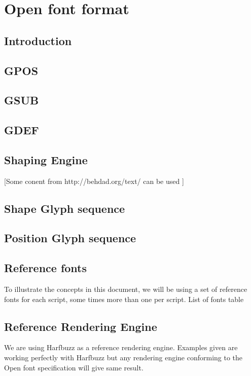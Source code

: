 \chapter{Open font format}

\section{Introduction}

\section{GPOS}

\section{GSUB}

\section{GDEF}

\section{Shaping Engine}

[Some conent from http://behdad.org/text/ can be used ]
\section{Shape Glyph sequence}

\section{Position Glyph sequence}

\section{Reference fonts}

To illustrate the concepts in this document, we will be using a set of reference fonts for each script, some times more than one per script. 
List of fonts table

\section{Reference Rendering Engine}

We are using Harfbuzz as  a reference rendering engine. Examples given are working perfectly with Harfbuzz but any rendering engine conforming to the Open font specification will give same result.

